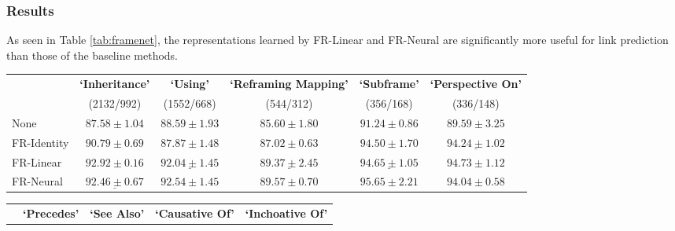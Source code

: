 \documentclass[11pt, a4paper]{article}
\begin{document}
\subsubsection*{Results}
As seen in Table \ref{tab:framenet}, the representations learned by FR-Linear and FR-Neural are significantly more useful for link prediction than those of the baseline methods. 

\begin{table*}[htp]
    \centering
    \setlength{\tabcolsep}{5pt}
    \begin{adjustbox}{center}
    \begin{tabular}{l c c c c c}
        \toprule
         & \bf{{\footnotesize `Inheritance'}} & \bf{{\footnotesize `Using'}} & \bf{{\footnotesize `Reframing Mapping'}} & \bf{{\footnotesize `Subframe'}} & \bf{{\footnotesize `Perspective On'}}   \\
                            &  (2132/992)         & (1552/668)    & (544/312)                & (356/168)       & (336/148)                \\
        \midrule
        None                & $87.58\pm1.04$                & $88.59\pm1.93$        & $85.60\pm1.80$         & $91.24\pm0.86$     & $89.59\pm3.25$                        \\
        FR-Identity            & $90.79\pm0.69$                & $87.87\pm1.48$        & $87.02\pm0.63$         & $94.50\pm1.70$     & $\underline{94.24\pm1.02}$                   \\
        FR-Linear              & $\boldsymbol{92.92\pm0.16}$  & $\underline{92.04\pm1.45}$   & $\underline{89.37\pm2.45}$ & $\underline{94.65\pm1.05}$     & $\boldsymbol{94.73\pm1.12}$              \\
        FR-Neural              & $\underline{92.46\pm0.67}$     & $\boldsymbol{92.54\pm1.45}$        & $\boldsymbol{89.57\pm0.70}$         & $\boldsymbol{95.65\pm2.21}$ & $94.04\pm0.58$     
    \\
    \bottomrule
    \end{tabular}
    \end{adjustbox}
    \begin{adjustbox}{center}
    \begin{tabular}{l c c c c}
        \\%
        \toprule
         & \bf{`Precedes'}  & \bf{`See Also'} & \bf{`Causative Of'} & \bf{`Inchoative Of'}    \\

\end{tabular}
\end{adjustbox}
\end{table*}
\end{document}
